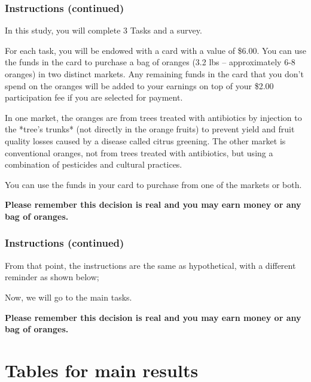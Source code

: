 \documentclass[12pt]{article}
\begin{document}
\clearpage

\subsubsection*{Instructions (continued)}

In this study, you will complete 3 Tasks and a survey.

For each task, you will be endowed with a card with a value of \$6.00. You can use the funds in the card to purchase a bag of oranges (3.2 lbs – approximately 6-8 oranges) in two distinct markets. Any remaining funds in the card that you don’t spend on the oranges will be added to your earnings on top of your \$2.00 participation fee if you are selected for payment.

In one market, the oranges are from trees treated with antibiotics by injection to the *tree’s trunks* (not directly in the orange fruits) to prevent yield and fruit quality losses caused by a disease called citrus greening. The other market is conventional oranges, not from trees treated with antibiotics, but using a combination of pesticides and cultural practices.

You can use the funds in your card to purchase from one of the markets or both.

\textbf{ Please remember this decision is real and you may earn money or any bag of oranges.}

\clearpage

\subsubsection*{Instructions (continued)}

 From that point, the instructions are the same as hypothetical, with a different reminder as shown below;

 Now, we will go to the main tasks.
\vspace{0.5cm}

\textbf{Please remember this decision is real and you may earn money or any bag of oranges.}


 \clearpage










\section{Tables for main results}
\end{document}
